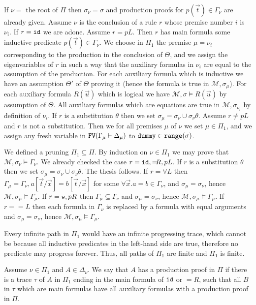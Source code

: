 \documentclass[a4paper,12pt]{article}
\newcommand{\setM}              { {\mathcal M} }
\newcommand{\FV}              { {\tt FV} }
\newcommand{\id}              { {\tt id} }
\newcommand{\range}           { {\tt range} }
\newcommand{\dummy}           { {\tt dummy} }
\newcommand{\eqL}     {= \! \!  \!  L}
\newcommand{\eqR}    {= \! \!  \!  R}
\newcommand{\Weak} { {\tt w} }
\begin{document}
If $\nu = $ the root of $\Pi$ then $\sigma_\nu = \sigma$ and production proofs for $p(\vec{t}) \in \Gamma_\nu$ are already given. Assume $\nu$ is the conclusion of a rule $r$ whose premise number $i$ is $\nu_i$. If $r = \id$ we are adone. Assume $r = p L$. Then $r$ has main formula some inductive predicate $p(\vec{t}) \in \Gamma_\nu$. We choose in $\Pi_1$ the premise $\mu = \nu_i$ corresponding to the production in the conclusion of $\Theta$, and we assign the eigenvariables of $r$ in such a way that the auxiliary formulas in $\nu_i$ are equal to the assumption of the production. For each auxiliary formula which is inductive we have an assumption $\Theta'$ of $\Theta$ proving it (hence the formula is true in $\setM, \sigma_\mu$). For each auxiliary formula $R(\vec{u})$ which is logical we have $\setM, \sigma \models R(\vec{u})$ by assumption of $\Theta$. All auxiliary formulas which are equations are true in $\setM, \sigma_{\nu_i}$ by definition of $\nu_i$. If $r$ is a substitution $\theta$ then we set $\sigma_\mu = \sigma_\nu \cup \sigma_\nu \theta$.  Assume $r \not = p L$ and $r$ is not a substitution.  Then we for all premises $\mu$ of $\nu$ we set $\mu \in \Pi_1$, and we assign any fresh variable in $\FV(\Gamma_\mu \vdash \Delta_\mu)$ to $\dummy \in \range(\sigma)$. 

We defined a pruning $\Pi_1 \subseteq \Pi$. By induction on $\nu \in \Pi_1$ we may prove that $\setM, \sigma_\nu \models \Gamma_\nu$. We already checked the case $r = \id, \eqR, p L$. If $r$ is a substitution $\theta$ then we set $\sigma_\mu = \sigma_\nu \cup \sigma_\nu \theta$. The thesis follows.  If $r = \forall L$ then $\Gamma_\mu = \Gamma_\nu, a[\vec{t}/\vec{x}]=b[\vec{t}/\vec{x}]$ for some $\forall \vec{x}.a=b \in \Gamma_\nu$, and $\sigma_\mu = \sigma_\nu$, hence $\setM, \sigma_\mu \models \Gamma_\mu$. If $r = \Weak, p R$ then $\Gamma_\mu \subseteq \Gamma_\nu$ and $\sigma_\mu = \sigma_\nu$, hence $\setM, \sigma_\mu \models \Gamma_\mu$. If $r = \eqL$ then each formula in $\Gamma_\nu$ is replaced by a formula with equal arguments and $\sigma_\mu = \sigma_\nu$, hence $\setM, \sigma_\mu \models \Gamma_\mu$. 

Every infinite path in $\Pi_1$ would have an infinite progressing trace, which cannot be because all inductive predicates in the left-hand side are true, therefore no predicate may progress forever. Thus, all paths of $\Pi_1$ are finite and $\Pi_1$ is finite. 

Assume $\nu \in \Pi_1$ and $A \in \Delta_\nu$. We say that $A$ has a production proof in $\Pi$ if there is a trace $\tau$ of $A$ in $\Pi_1$ ending in the main formula of $\id$ or $\eqR$, such that all $B$ in $\tau$ which are main formulas have all auxiliary formulas with a production proof in $\Pi$. 
\end{document}
